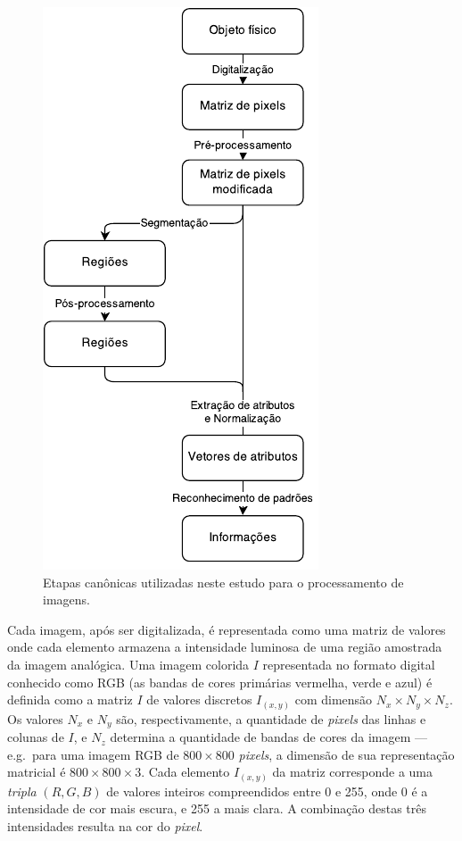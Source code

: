 \begin{figure}[ht!]
\begin{center}
 \caption{Etapas
      canônicas utilizadas neste estudo para o processamento de
      imagens.}  
\label{fig:etapas-pdi}
        \includegraphics[scale=1.]{figs/etapas_pdi} 
\fonteminha
\end{center}
\end{figure}

Cada imagem, após ser digitalizada, é representada como uma matriz de
valores onde cada elemento armazena a intensidade luminosa de uma
região amostrada da imagem analógica. Uma imagem colorida $I$
representada no formato digital conhecido como RGB (as bandas de cores
primárias vermelha, verde e azul) é definida como a matriz $I$ de
valores discretos $I_{(x,y)}$ com dimensão $N_x \times N_y \times
N_z$. Os valores $N_x$ e $N_y$ são, respectivamente, a quantidade
de \textit{pixels} das linhas e colunas de $I$, e $N_z$ determina a
quantidade de bandas de cores da imagem --- e.g.\ para uma imagem RGB
de $800 \times 800$ \textit{pixels}, a dimensão de sua representação
matricial é $800 \times 800 \times 3$. Cada elemento $I_{(x,y)}$ da
matriz corresponde a uma \emph{tripla} $(R, G, B)$ de valores inteiros
compreendidos entre 0 e 255, onde 0 é a intensidade de cor mais
escura, e 255 a mais clara. A combinação destas três intensidades
resulta na cor do \textit{pixel}.

